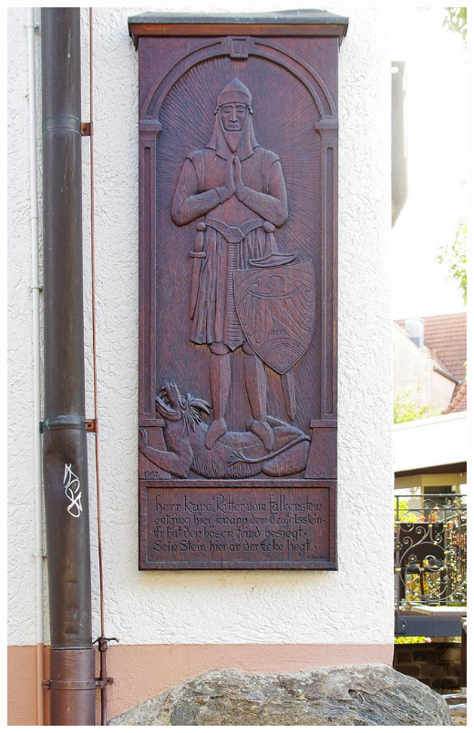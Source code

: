 \documentclass[landscape, a4paper]{article}
\begin{document}
\begin{minipage}[t]{0.31\textwidth}
	\includegraphics[width=\linewidth]{./figures/kuno_von_falkenstein_resized.jpg}
	\setlength{\parskip}{0.25cm}

\end{minipage}%
\hfill%
\vrule width 0.01cm
\hfill%
\end{document}
